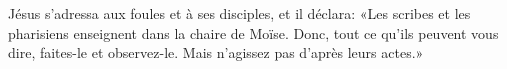 \encetemps Jésus s’adressa aux foules et à ses disciples, et il déclara:
	«Les scribes et les pharisiens enseignent dans la chaire de Moïse.
Donc, tout ce qu’ils peuvent vous dire, faites-le et observez-le.
	Mais n’agissez pas d’après leurs actes.»
